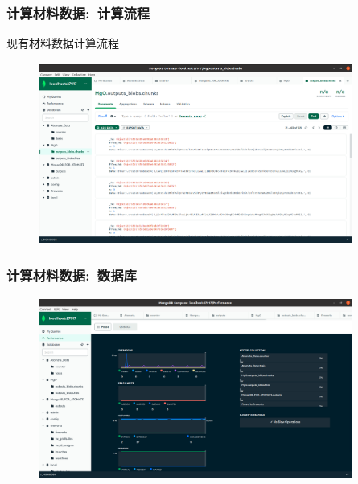 \frame
{
	\frametitle{计算材料数据:~计算流程}
	现有材料数据计算流程
\begin{figure}[h!]
\vspace*{-0.15in}
\centering
\includegraphics[height=2.35in,width=4.05in,viewport=0 0 1530 873,clip]{Figures/Database_Materials-Flow.png}
\label{DataBase_Materials-Flow}
\end{figure}
}

\frame
{
	\frametitle{计算材料数据:~数据库}
\begin{figure}[h!]
\vspace*{-0.15in}
\centering
\includegraphics[height=2.35in,width=4.05in,viewport=0 0 1527 872,clip]{Figures/Database_Materials-3.png}
\label{DataBase_Materials-3}
\end{figure}
}

